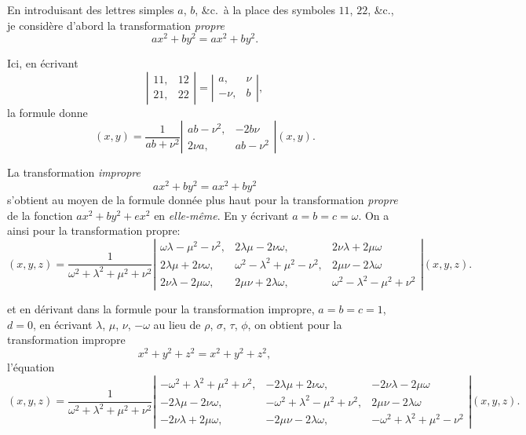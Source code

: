 \documentclass[11pt,a4paper]{article}
\begin{document}
\medskip

En introduisant des lettres simples $a$, $b$, \&c.\ \`a la place des symboles $11$, $22$, \&c., je consid\`ere d'abord la transformation \textit{propre}
\[
ax^2 + by^2 = ax^2 + by^2.
\]

Ici, en \'ecrivant
\[
\left\lvert\begin{array}{cc}
11, & 12\\
21, & 22
\end{array}\right\rvert =
\left\lvert\begin{array}{cc}
a, & \nu\\
-\nu, & b
\end{array}\right\rvert ,
\]
la formule donne
\[
(x,y) = \frac{1}{ab + \nu^2}\left\lvert\begin{array}{cc}
ab - \nu^2, & -2b\nu\\
2\nu a, & ab - \nu^2
\end{array}\right\rvert (x,y).
\]

\medskip

La transformation \textit{impropre}
\[
ax^2 + by^2 = ax^2 + by^2
\]
s'obtient au moyen de la formule donn\'ee plus haut pour la transformation \textit{propre} de la fonction $ax^2 + by^2 + ex^2$ en \textit{elle-m\^eme}. En y \'ecrivant $a = b = c = \omega$. On a ainsi pour la transformation propre:
\[
(x,y,z) = \frac{1}{\omega^2 + \lambda^2 + \mu^2 + \nu^2}
\left\lvert\begin{array}{ccc}
\omega\lambda - \mu^2 - \nu^2, & 2\lambda\mu - 2\nu\omega, & 2\nu\lambda + 2\mu\omega\\
2\lambda\mu + 2\nu\omega, & \omega^2 - \lambda^2 + \mu^2 - \nu^2, & 2\mu\nu - 2\lambda\omega\\
2\nu\lambda - 2\mu\omega, & 2\mu\nu + 2\lambda\omega, & \omega^2 - \lambda^2 - \mu^2 + \nu^2
\end{array}\right\rvert
(x,y,z).
\]

\medskip

et en d\'erivant dans la formule pour la transformation impropre, $a = b = c = 1$, $d = 0$, en \'ecrivant $\lambda$, $\mu$, $\nu$, $-\omega$ au lieu de $\rho$, $\sigma$, $\tau$, $\phi$, on obtient pour la transformation impropre
\[
x^2 + y^2 + z^2 = x^2 + y^2 + z^2,
\]
l'\'equation
\[
(x,y,z) = \frac{1}{\omega^2 + \lambda^2 + \mu^2 + \nu^2}
\left\lvert\begin{array}{ccc}
-\omega^2 + \lambda^2 + \mu^2 + \nu^2, & -2\lambda\mu + 2\nu\omega, & -2\nu\lambda - 2\mu\omega\\
-2\lambda\mu - 2\nu\omega, & -\omega^2 + \lambda^2 - \mu^2 + \nu^2, & 2\mu\nu - 2\lambda\omega\\
-2\nu\lambda + 2\mu\omega, & -2\mu\nu - 2\lambda\omega, & -\omega^2 + \lambda^2 + \mu^2 - \nu^2
\end{array}\right\rvert
(x,y,z).
\]
\end{document}
